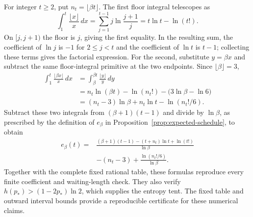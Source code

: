 For integer $t\ge2$, put $n_t=\lfloor\beta t\rfloor$.
The first floor integral telescopes as
\[
 \int_1^t\frac{\lfloor x\rfloor}{x}\,dx
 =\sum_{j=1}^{t-1}j\ln\frac{j+1}{j}
 =t\ln t-\ln(t!).
\]
On $[j,j+1)$ the floor is $j$, giving the first equality.
In the resulting sum, the coefficient of $\ln j$ is $-1$ for
$2\le j<t$ and the coefficient of $\ln t$ is $t-1$; collecting
these terms gives the factorial expression.
For the second, substitute $y=\beta x$ and subtract the same
floor-integral primitive at the two endpoints. Since
$\lfloor\beta\rfloor=3$,
\[
 \begin{aligned}
 \int_1^t\frac{\lfloor\beta x\rfloor}{x}\,dx
 &=\int_\beta^{\beta t}\frac{\lfloor y\rfloor}{y}\,dy\\
 &=n_t\ln(\beta t)-\ln(n_t!)
      -\bigl(3\ln\beta-\ln6\bigr)\\
 &=(n_t-3)\ln\beta+n_t\ln t-\ln(n_t!/6).
 \end{aligned}
\]
Subtract these two integrals from $(\beta+1)(t-1)$ and divide by
$\ln\beta$, as prescribed by the definition of $e_\beta$ in
Proposition~\ref{prop:expected-schedule}, to obtain
\[
 \begin{aligned}
 e_\beta(t)={}&
 \frac{(\beta+1)(t-1)-(t+n_t)\ln t+\ln(t!)}{\ln\beta}\\
 &-(n_t-3)+\frac{\ln(n_t!/6)}{\ln\beta}.
 \end{aligned}
\]
Together with the complete fixed rational table, these formulas
reproduce every finite coefficient and waiting-length check.
They also verify $h(p_*)>(1-2p_*)\ln2$, which supplies the entropy tent.
The fixed table and outward interval bounds provide a reproducible
certificate for these numerical claims.

